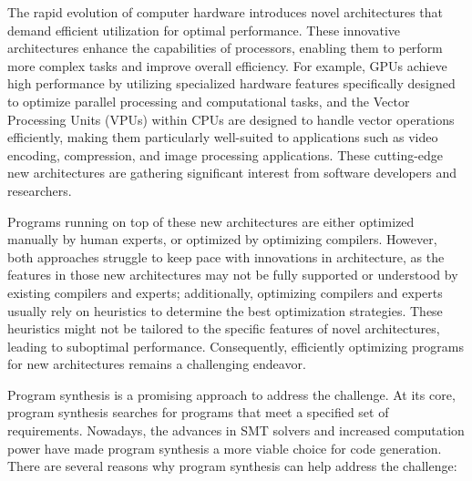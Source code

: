 
The rapid evolution of computer hardware introduces novel
architectures that demand efficient utilization for optimal performance.
These innovative architectures enhance the capabilities of processors,
enabling them to perform more complex tasks and improve overall efficiency.
%
For example, GPUs achieve high performance by utilizing specialized hardware
features specifically designed to optimize parallel processing and
computational tasks, and the Vector Processing Units (VPUs) within CPUs
are designed to handle vector operations efficiently,
making them particularly well-suited to applications
 such as video encoding, compression,
and image processing applications.
%
These cutting-edge new architectures are gathering significant interest
from software developers and researchers.

Programs running on top of these new architectures are either
optimized manually by human experts, or optimized by optimizing compilers.
However, both approaches struggle to keep pace
with innovations in architecture, as
the features in those new architectures may not be fully supported
or understood by existing compilers and experts;
%
additionally, optimizing compilers and experts usually rely on heuristics
to determine the best optimization strategies.
%
These heuristics might not be tailored to the specific features
of novel architectures, leading to suboptimal performance.
%
Consequently, efficiently optimizing programs for new architectures remains
a challenging endeavor.

Program synthesis is a promising approach to address the challenge.
%
At its core, program synthesis searches for programs
that meet a specified set of requirements.
%
Nowadays, the advances in SMT solvers and increased computation power
have made program synthesis a more viable choice for code generation.
%
There are several reasons why program synthesis can help address the challenge:

